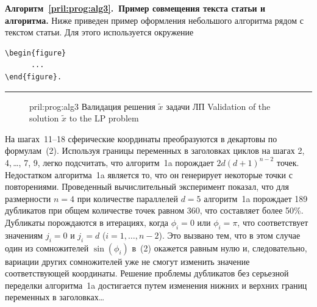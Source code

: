 \documentclass[10pt,a4paper]{book}
\newcommand{\ceq}{\mathrel{\vcenter{\hbox{:=}}}}
\begin{document}
\medskip
\textbf{Алгоритм~\ref{pril:prog:alg3}.~Пример совмещения текста статьи и алгоритма.} 
Ниже приведен пример оформления небольшого алгоритма рядом с текстом статьи.
Для этого используется окружение 
\begin{verbatim}
\begin{figure}
      ...
\end{figure}.
\end{verbatim}
%
%
\medskip
\hrule
\bigskip

\begin{figure}
      \begin{nmAlgorithm}{pril:prog:alg3}
            {Валидация решения $\widetilde{x}$ задачи ЛП}
            {Validation of the solution $\widetilde{x}$ to the LP problem}
            \algLine{$\varphi \ceq \pi/d$}
            \algLine[1]{$v \ceq g(k,d,\rho)$}
            \algLine{\algENDFOR}
            \algLine[0][a3:l10]{\algSTOP}
      \end{nmAlgorithm}
\end{figure}
  
На шагах~11--18 сферические координаты преобразуются в декартовы по 
формулам~(2). Используя границы переменных в заголовках 
циклов на шагах 2, 4,\,\dots, 7, 9, легко подсчитать, что алгоритм~1a 
порождает $2d{(d + 1)^{n - 2}}$ точек. Недостатком алгоритма~1a 
является то, что он генерирует некоторые точки с повторениями. Проведенный 
вычислительный эксперимент показал, что для размерности $n = 4$ при количестве
параллелей $d = 5$ алгоритм~1a порождает 189 дубликатов при общем 
количестве точек равном 360, что составляет более 50\%. Дубликаты порождаются в 
итерациях, когда ${\phi _i} = 0$ или ${\phi _i} = \pi$, что соответствует
значениям ${j_i} = 0$ и ${j_i} = d$ ($i = 1, \ldots ,n - 2$). Это вызвано тем, 
что в этом случае один из сомножителей $\sin(\phi _i)$ в~(2) 
окажется равным нулю и, следовательно, вариации других сомножителей уже не смогут 
изменить значение соответствующей координаты. Решение проблемы дубликатов без 
серьезной переделки алгоритма~1a достигается путем изменения нижних 
и верхних границ переменных в заголовках\ldots
\end{document}
